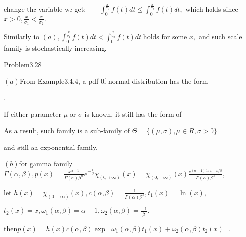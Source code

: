 \documentclass{article}
\begin{document}
change the variable we get:$\qquad \int_{0}^{\frac{x}{\sigma _{1}}%
}f(t)dt\leq \int_{0}^{\frac{x}{\sigma _{2}}}f(t)dt,$ which holds since $x>0,%
\frac{x}{\sigma _{1}}<\frac{x}{\sigma _{2}}.$

Similarly to $\left( a\right) ,\int_{0}^{\frac{x}{\sigma _{1}}%
}f(t)dt<\int_{0}^{\frac{x}{\sigma _{2}}}f(t)dt$ holds for some $x,$ and such
scale family is stochastically increasing.

Problem3.28

$\left( a\right) $From Example3.4.4, a pdf 0f normal distribution has the
form 

.

If either parameter $\mu $ or $\sigma $ is known, it still has the form of


As a result, such family is a sub-family of $\Theta =\{\left( \mu ,\sigma
\right) ,\mu \in R,\sigma >0\}$

and still an exponential family.

$\left( b\right) $for gamma family $\Gamma \left( \alpha ,\beta \right)
,p(x)=\frac{x^{\alpha -1}}{\Gamma \left( \alpha \right) \beta ^{\alpha }}e^{-%
\frac{x}{\beta }}\chi _{(0,+\infty )}\left( x\right) =\chi _{(0,+\infty
)}\left( x\right) \frac{e^{\left( \alpha -1\right) \ln x-x/\beta }}{\Gamma
\left( \alpha \right) \beta ^{\alpha }},$

let $h(x)=\chi _{(0,+\infty )}\left( x\right) ,c\left( \alpha ,\beta \right)
=\frac{1}{\Gamma \left( \alpha \right) \beta ^{\alpha }},t_{1}\left(
x\right) =\ln \left( x\right) ,$

$t_{2}\left( x\right) =x,\omega _{1}\left( \alpha ,\beta \right) =\alpha
-1,\omega _{2}\left( \alpha ,\beta \right) =\frac{-1}{\beta }.$

then\qquad $p\left( x\right) =h\left( x\right) c\left( \alpha ,\beta \right)
\exp \left[ \omega _{1}\left( \alpha ,\beta \right) t_{1}\left( x\right)
+\omega _{2}\left( \alpha ,\beta \right) t_{2}\left( x\right) \right] .$
\end{document}
